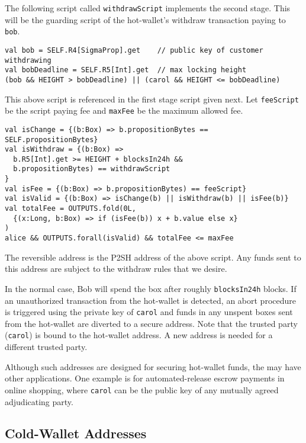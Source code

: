\documentclass[runningheads]{llncs}
\begin{document}
The following script called \texttt{withdrawScript} implements the second stage. This will be the guarding script of the hot-wallet's withdraw transaction paying to \texttt{bob}.

\small{
\begin{verbatim}
val bob = SELF.R4[SigmaProp].get    // public key of customer withdrawing
val bobDeadline = SELF.R5[Int].get  // max locking height
(bob && HEIGHT > bobDeadline) || (carol && HEIGHT <= bobDeadline)
\end{verbatim}
}

This above script is referenced in the first stage script given next. Let \texttt{feeScript} be the script paying fee and \texttt{maxFee} be the maximum allowed fee. 

\small{
\begin{verbatim}
val isChange = {(b:Box) => b.propositionBytes == SELF.propositionBytes}
val isWithdraw = {(b:Box) => 
  b.R5[Int].get >= HEIGHT + blocksIn24h && 
  b.propositionBytes) == withdrawScript
}
val isFee = {(b:Box) => b.propositionBytes) == feeScript}
val isValid = {(b:Box) => isChange(b) || isWithdraw(b) || isFee(b)}
val totalFee = OUTPUTS.fold(0L, 
  {(x:Long, b:Box) => if (isFee(b)) x + b.value else x}
)
alice && OUTPUTS.forall(isValid) && totalFee <= maxFee
\end{verbatim}
}

The reversible address is the P2SH address of the above script. Any funds sent to this address are subject to the withdraw rules that we desire.

In the normal case, Bob will spend the box after roughly \texttt{blocksIn24h} blocks. If an unauthorized transaction from the hot-wallet is detected, an abort procedure is triggered using the private key of \texttt{carol} and funds in any unspent boxes sent from the hot-wallet are diverted to a secure address. %
Note that the trusted party (\texttt{carol}) is bound to the hot-wallet address. A new address is needed for a different trusted party. 

Although such addresses are designed for securing hot-wallet funds, the may have other applications. One example is for automated-release escrow payments in online shopping, where \texttt{carol} can be the public key of any mutually agreed adjudicating party. 

\subsection{Cold-Wallet Addresses}
\end{document}
